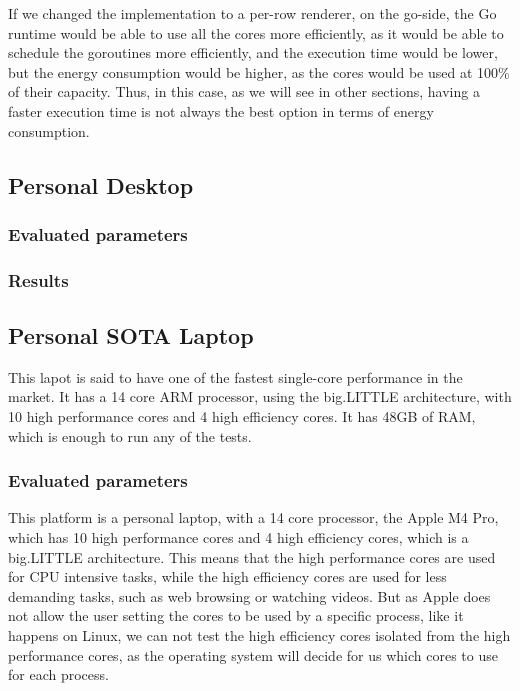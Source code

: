 If we changed the implementation to a per-row renderer, on the go-side, the Go runtime would be able to use all the cores more efficiently, as it would be able to schedule the goroutines more efficiently, and the execution time would be lower, but the energy consumption would be higher, as the cores would be used at 100\% of their capacity. Thus, in this case, as we will see in other sections, having a faster execution time is not always the best option in terms of energy consumption.





\subsection{Personal Desktop}
\subsubsection{Evaluated parameters}
\subsubsection{Results}

\subsection{Personal SOTA Laptop}
This lapot is said to have one of the fastest single-core performance in the market. It has a 14 core ARM processor, using the big.LITTLE architecture, with 10 high performance cores and 4 high efficiency cores. It has 48GB of RAM, which is enough to run any of the tests.


\subsubsection{Evaluated parameters}

This platform is a personal laptop, with a 14 core processor, the Apple M4 Pro, which has 10 high performance cores and 4 high efficiency cores, which is a big.LITTLE architecture. This means that the high performance cores are used for CPU intensive tasks, while the high efficiency cores are used for less demanding tasks, such as web browsing or watching videos. But as Apple does not allow the user setting the cores to be used by a specific process, like it happens on Linux, we can not test the high efficiency cores isolated from the high performance cores, as the operating system will decide for us which cores to use for each process. 

